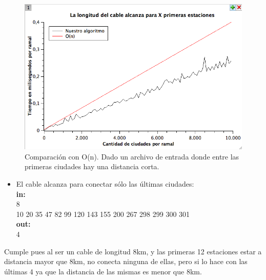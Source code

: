 \begin{figure}[H]
\begin{center}

  \includegraphics[width=\linewidth]{../graficos/ej1/PrimerasCiudades.png}
  \caption{{\small Comparación con O(n). Dado un archivo de entrada donde entre las primeras ciudades hay una distancia corta.}} \label{ej1-tiempo-vs-cant-ciudadades-primeras-ciudades}
\endminipage

\end{center}
\end{figure}
\begin{itemize}
\item El cable alcanza para conectar sólo las últimas ciudades:\\
\textbf{in:}\\
8\\
10 20 35 47 82 99 120 143 155 200 267 298 299 300 301\\
\textbf{out:}\\
4\\
\end{itemize}

Cumple pues al ser un cable de longitud 8km, y las primeras 12 estaciones estar a distancia mayor que 8km, no conecta ninguna de ellas, pero si lo hace con las últimas 4 ya que la distancia de las mismas es menor que 8km. \\

